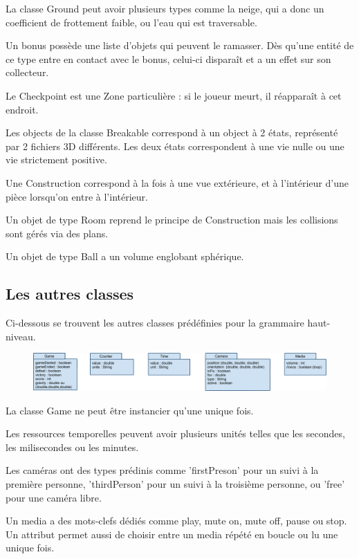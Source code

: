 La classe Ground peut avoir plusieurs types comme la neige, qui a donc un coefficient de frottement faible, ou l'eau qui est traversable.

Un bonus possède une liste d'objets qui peuvent le ramasser. Dès qu'une entité de ce type entre en contact avec le bonus, celui-ci
disparaît et a un effet sur son collecteur.

Le Checkpoint est une Zone particulière : si le joueur meurt, il réapparaît à cet endroit.

Les objects de la classe Breakable correspond à un object à 2 états, représenté par 2 fichiers 3D différents. Les deux états correspondent
à une vie nulle ou une vie strictement positive.

Une Construction correspond à la fois à une vue extérieure, et à l'intérieur d'une pièce lorsqu'on entre à l'intérieur.

Un objet de type Room reprend le principe de Construction mais les collisions sont gérés via des plans.

Un objet de type Ball a un volume englobant sphérique.

\subsection{Les autres classes}

Ci-dessous se trouvent les autres classes prédéfinies pour la grammaire haut-niveau.

\begin{figure}[h]
 \centering
 \includegraphics[width=\textwidth]{img/otherclass}
\end{figure}

La classe Game ne peut être instancier qu'une unique fois.

Les ressources temporelles peuvent avoir plusieurs unités telles que les secondes, les milisecondes ou les minutes.

Les caméras ont des types prédinis comme 'firstPreson' pour un suivi à la première personne, 'thirdPerson' pour un suivi à la troisième personne, ou 'free'
pour une caméra libre.

Un media a des mots-clefs dédiés comme play, mute on, mute off, pause ou stop.
Un attribut permet aussi de choisir entre un media répété en boucle ou lu une unique fois.

